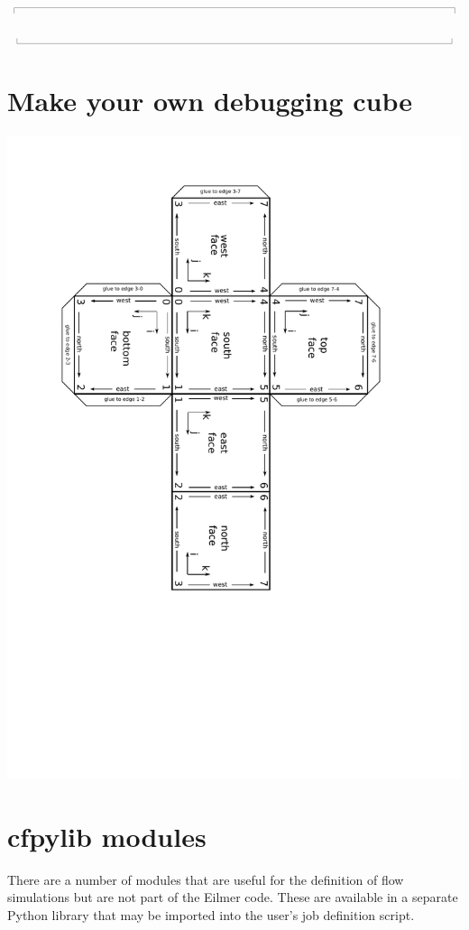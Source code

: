 \documentclass[12pt,a4paper,twoside]{article}
\newcommand{\topbar}{\ensuremath{
    \rule{0.1mm}{2.0mm} \rule[2.0mm]{159.5mm}{0.1mm} \rule{0.1mm}{2.0mm}
}}
\newcommand{\bottombar}{\ensuremath{
    \rule{0.1mm}{2.0mm} \rule{159.5mm}{0.1mm} \rule{0.1mm}{2.0mm}
}}
\begin{document}
\noindent
\topbar

\bottombar

\cleardoublepage


\cleardoublepage


\cleardoublepage
\section{Make your own debugging cube}
\label{cube-development}
%
\centerline{\includegraphics[viewport=69 220 490 778,clip=true,angle=180]{figs/paper-cube-development.pdf}}

%

\cleardoublepage
\section{cfpylib modules}
There are a number of modules that are useful for the definition of flow
simulations but are not part of the Eilmer code.
These are available in a separate Python library that may be imported into the
user's job definition script.
 
\end{document}
